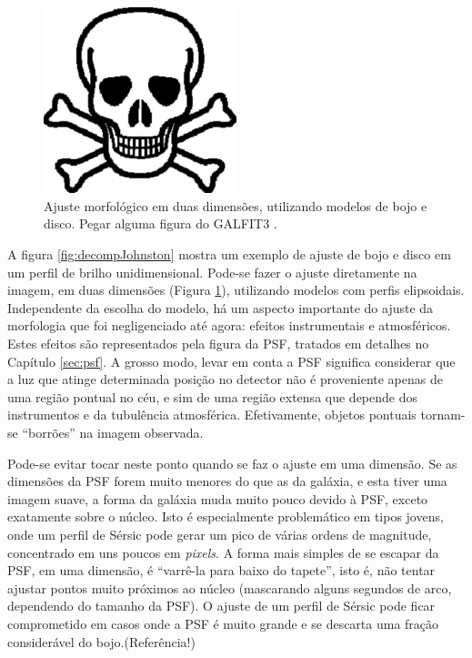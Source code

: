 \begin{figure}
	\includegraphics[width=0.5\textwidth]{figuras/test}
	\caption[Ajuste morfológico em duas dimensões] {\TODO Ajuste morfológico
	em duas dimensões, utilizando modelos de bojo e disco. Pegar alguma figura do
	GALFIT3 \citep{Peng2010}.}
	\label{fig:decompGalfit}
\end{figure}

A figura \ref{fig:decompJohnston} mostra um exemplo de ajuste de bojo e disco em
um perfil de brilho unidimensional. Pode-se fazer o ajuste diretamente na
imagem, em duas dimensões (Figura \ref{fig:decompGalfit}), utilizando modelos
com perfis elipsoidais. Independente da escolha do modelo, há um aspecto
importante do ajuste da morfologia que foi negligenciado até agora: efeitos
instrumentais e atmosféricos. Estes efeitos são representados pela figura da
PSF, tratados em detalhes no Capítulo \ref{sec:psf}. A grosso modo, levar em
conta a PSF significa considerar que a luz que atinge determinada posição no
detector não é proveniente apenas de uma região pontual no céu, e sim de uma
região extensa que depende dos instrumentos e da tubulência atmosférica.
Efetivamente, objetos pontuais tornam-se ``borrões'' na imagem observada.

Pode-se evitar tocar neste ponto quando se faz o ajuste em uma dimensão.
Se as dimensões da PSF forem muito menores do que as da galáxia, e esta tiver
uma imagem suave, a forma da galáxia muda muito pouco devido à PSF, exceto
exatamente sobre o núcleo. Isto é especialmente problemático em tipos jovens,
onde um perfil de Sérsic pode gerar um pico de várias ordens de magnitude,
concentrado em uns poucos em {\em pixels}. A forma mais simples de se escapar da
PSF, em uma dimensão, é ``varrê-la para baixo do tapete'', isto é, não tentar
ajustar pontos muito próximos ao núcleo (mascarando alguns segundos de arco,
dependendo do tamanho da PSF). O ajuste de um perfil de Sérsic pode ficar
comprometido em casos onde a PSF é muito grande e se descarta uma fração
considerável do bojo.\fixme(Referência!)

